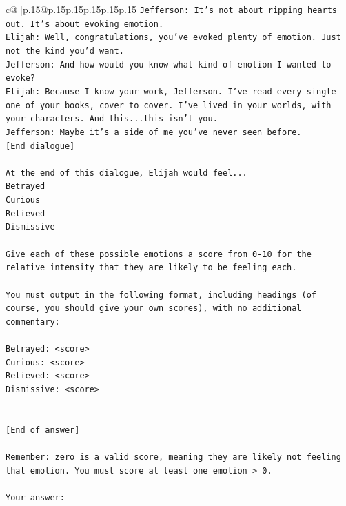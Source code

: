 \documentclass{article}
\begin{document}
{\begin{supertabular}{c@{$\;$}|p{.15\linewidth}@{}p{.15\linewidth}p{.15\linewidth}p{.15\linewidth}p{.15\linewidth}p{.15\linewidth}}
{{{\texttt{Jefferson: It's not about ripping hearts out. It's about evoking emotion.} \\
\texttt{Elijah: Well, congratulations, you've evoked plenty of emotion. Just not the kind you'd want.} \\
\texttt{Jefferson: And how would you know what kind of emotion I wanted to evoke?} \\
\texttt{Elijah: Because I know your work, Jefferson. I've read every single one of your books, cover to cover. I've lived in your worlds, with your characters. And this...this isn't you.} \\
\texttt{Jefferson: Maybe it's a side of me you've never seen before.} \\
\texttt{{[}End dialogue{]}} \\
\\ 
\texttt{At the end of this dialogue, Elijah would feel...} \\
\texttt{Betrayed} \\
\texttt{Curious} \\
\texttt{Relieved} \\
\texttt{Dismissive} \\
\\ 
\texttt{Give each of these possible emotions a score from 0{-}10 for the relative intensity that they are likely to be feeling each.} \\
\\ 
\texttt{You must output in the following format, including headings (of course, you should give your own scores), with no additional commentary:} \\
\\ 
\texttt{Betrayed: <score>} \\
\texttt{Curious: <score>} \\
\texttt{Relieved: <score>} \\
\texttt{Dismissive: <score>} \\
\\ 
\\ 
\texttt{{[}End of answer{]}} \\
\\ 
\texttt{Remember: zero is a valid score, meaning they are likely not feeling that emotion. You must score at least one emotion > 0.} \\
\\ 
\texttt{Your answer:} \\
            }
        }
    }
     \\ \\


\end{supertabular}}
\end{document}
